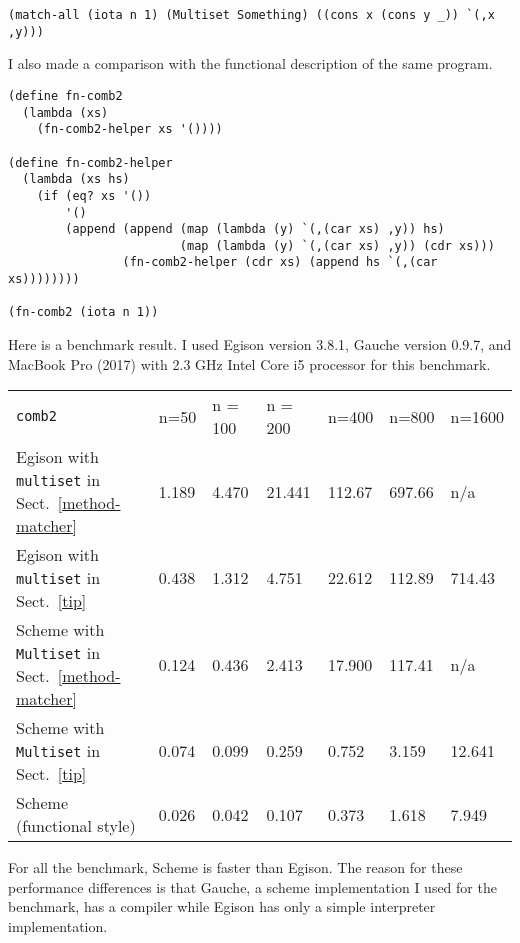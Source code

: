 \documentclass[acmlarge]{acmart}
\begin{document}
\begin{lstlisting}[language=egison]
(match-all (iota n 1) (Multiset Something) ((cons x (cons y _)) `(,x ,y)))
\end{lstlisting}

\noindent I also made a comparison with the functional description of the same program.

\begin{lstlisting}[language=egison]
(define fn-comb2
  (lambda (xs)
    (fn-comb2-helper xs '())))

(define fn-comb2-helper
  (lambda (xs hs)
    (if (eq? xs '())
        '()
        (append (append (map (lambda (y) `(,(car xs) ,y)) hs)
                        (map (lambda (y) `(,(car xs) ,y)) (cdr xs)))
                (fn-comb2-helper (cdr xs) (append hs `(,(car xs))))))))

(fn-comb2 (iota n 1))
\end{lstlisting}

\noindent Here is a benchmark result.
I used Egison version 3.8.1, Gauche version 0.9.7, and MacBook Pro (2017) with 2.3 GHz Intel Core i5 processor for this benchmark.

\medskip

\begin{tabular}{|l||l|l|l|l|l|l|} \hline
\texttt{comb2} & n=50 & n = 100 & n = 200 & n=400 & n=800 & n=1600 \\ \hhline{|=#=|=|=|=|=|=|}
Egison with \texttt{multiset} in Sect.~\ref{method-matcher} & 1.189 & 4.470 & 21.441 & 112.67 & 697.66 & n/a \\ \hline
Egison with \texttt{multiset} in Sect.~\ref{tip} & 0.438 & 1.312& 4.751 & 22.612 & 112.89 & 714.43 \\ \hline
Scheme with \texttt{Multiset} in Sect.~\ref{method-matcher} & 0.124 & 0.436 & 2.413 & 17.900 & 117.41 & n/a \\ \hline
Scheme with \texttt{Multiset} in Sect.~\ref{tip} & 0.074 & 0.099 & 0.259 & 0.752 & 3.159 & 12.641 \\ \hline
Scheme (functional style) & 0.026 & 0.042 & 0.107 & 0.373 & 1.618 & 7.949 \\ \hline
\end{tabular}

\medskip

\noindent For all the benchmark, Scheme is faster than Egison.
The reason for these performance differences is that Gauche, a scheme implementation I used for the benchmark, has a compiler while Egison has only a simple interpreter implementation.
\end{document}
